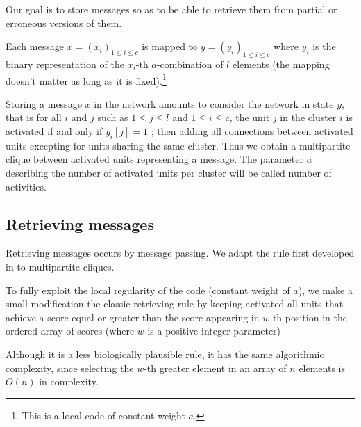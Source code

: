 \documentclass[english,11pt,twocolumn]{IEEEtran}
\renewcommand{\le}{\leqslant}
\theoremstyle{definition}
\begin{document}
	Our goal is to store messages so as to be able to retrieve them from partial or erroneous versions of them.
	
	Each message $x = (x_i)_{1 \le i \le c}$ is mapped to $y = (y_i)_{1 \le i \le c}$ where $y_i$ is the binary representation of the $x_i$-th $a$-combination of $l$ elements (the mapping doesn't matter as long as it is fixed).\footnote{This is a local code of constant-weight $a$.}
	
	Storing a message $x$ in the network amounts to consider the network in state $y$, that is for all $i$ and $j$ such as $1 \le j \le l$ and $1 \le i \le c$, the unit $j$ in the cluster $i$ is activated if and only if $y_i[j] = 1$ ; then adding all connections between activated units excepting for units sharing the same cluster. Thus we obtain a multipartite clique between activated units representing a message. The parameter $a$ describing the number of activated units per cluster will be called number of activities.
		
	\subsection{Retrieving messages}	
		
		Retrieving messages occurs by message passing. We adapt the rule first developed in \cite{GriBer20117} to multipartite cliques.		
		
%		
%	
		

		To fully exploit the local regularity of the code (constant weight of $a$), we make a small modification the classic retrieving rule	by keeping activated all units that achieve a score equal or greater than the score appearing in $w$-th position in the ordered array of scores (where $w$ is a positive integer parameter)
		
		
		Although it is a less biologically plausible rule, it has the same algorithmic complexity, since selecting the $w$-th greater element in an array of $n$ elements is $O(n)$ in complexity.
		
\end{document}
